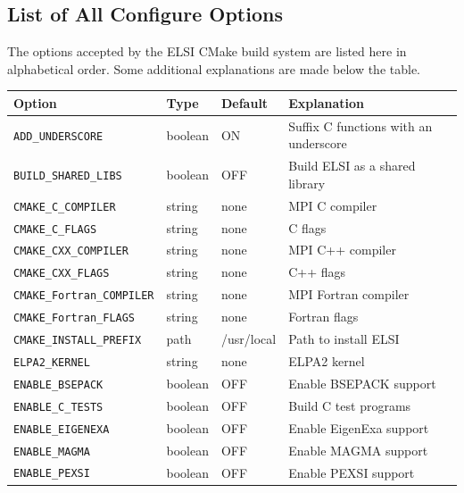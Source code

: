 \documentclass{report}
\begin{document}
\subsection{List of All Configure Options}
\label{subsec:config_options}
The options accepted by the ELSI CMake build system are listed here in alphabetical order. Some additional explanations are made below the table.

\begin{longtable}[]{|p{40mm}|p{15mm}|p{20mm}|p{87mm}|}
\hline
\multicolumn{1}{|l|}{\textbf{Option}} & \multicolumn{1}{l|}{\textbf{Type}} & \multicolumn{1}{l|}{\textbf{Default}} & \multicolumn{1}{l|}{\textbf{Explanation}}\\
\hline
\texttt{ADD\_UNDERSCORE}          & boolean & ON          & Suffix C functions with an underscore\\
\hline
\texttt{BUILD\_SHARED\_LIBS}      & boolean & OFF         & Build ELSI as a shared library\\
\hline
\texttt{CMAKE\_C\_COMPILER}       & string  & none        & MPI C compiler\\
\hline
\texttt{CMAKE\_C\_FLAGS}          & string  & none        & C flags\\
\hline
\texttt{CMAKE\_CXX\_COMPILER}     & string  & none        & MPI C++ compiler\\
\hline
\texttt{CMAKE\_CXX\_FLAGS}        & string  & none        & C++ flags\\
\hline
\texttt{CMAKE\_Fortran\_COMPILER} & string  & none        & MPI Fortran compiler\\
\hline
\texttt{CMAKE\_Fortran\_FLAGS}    & string  & none        & Fortran flags\\
\hline
\texttt{CMAKE\_INSTALL\_PREFIX}   & path    & /usr/local  & Path to install ELSI\\
\hline
\texttt{ELPA2\_KERNEL}            & string  & none        & ELPA2 kernel\\
\hline
\texttt{ENABLE\_BSEPACK}          & boolean & OFF         & Enable BSEPACK support\\
\hline
\texttt{ENABLE\_C\_TESTS}         & boolean & OFF         & Build C test programs\\
\hline
\texttt{ENABLE\_EIGENEXA}         & boolean & OFF         & Enable EigenExa support\\
\hline
\texttt{ENABLE\_MAGMA}            & boolean & OFF         & Enable MAGMA support\\
\hline
\texttt{ENABLE\_PEXSI}            & boolean & OFF         & Enable PEXSI support\\

\end{longtable}
\end{document}
